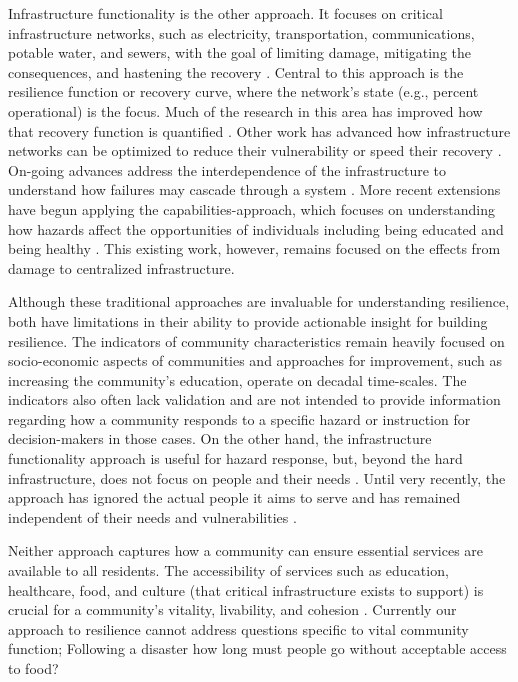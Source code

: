 \documentclass[9pt,twocolumn,twoside,lineno]{pnas-new}
\begin{document}
Infrastructure functionality is the other approach.
It focuses on critical infrastructure networks, such as electricity, transportation, communications, potable water, and sewers, with the goal of limiting damage, mitigating the consequences, and hastening the recovery \cite{Bruneau2003-px, Barker2013-od, Hosseini2016-pm, Haimes2009-gj, Guidotti2016-vu, Curt2018-kl}.
Central to this approach is the resilience function or recovery curve, where the network's state (e.g., percent operational) is the focus.
Much of the research in this area has improved how that recovery function is quantified \cite{Bruneau2003-px, Chang2004-et, Cimellaro2010-ov, Vugrin2010-vy, Ayyub2014-mf, Sharma2018-rs}.
Other work has advanced how infrastructure networks can be optimized to reduce their vulnerability or speed their recovery \cite{Hosseini2016-pm, Xu2007-sc}.
On-going advances address the interdependence of the infrastructure to understand how failures may cascade through a system \cite{Guidotti2016-vu, Gardoni2018-xu}.
More recent extensions \cite{Gardoni2018-xu, Clark2018-pr, Guidotti2019-fc} have begun applying the capabilities-approach, which focuses on understanding how hazards affect the opportunities of individuals including being educated and being healthy \cite{Murphy2006-io}. 
This existing work, however, remains focused on the effects from damage to centralized infrastructure.

Although these traditional approaches are invaluable for understanding resilience, both have limitations in their ability to provide actionable insight for building resilience.
The indicators of community characteristics remain heavily focused on socio-economic aspects of communities \cite{Koliou2018-jt} and approaches for improvement, such as increasing the community's education, operate on decadal time-scales.
The indicators also often lack validation \cite{Bakkensen2016-ht} and are not intended to provide information regarding how a community responds to a specific hazard or instruction for decision-makers in those cases.
On the other hand, the infrastructure functionality approach is useful for hazard response, but, beyond the hard infrastructure, does not focus on people and their needs \cite{Doorn2018-fx}. 
Until very recently, the approach has ignored the actual people it aims to serve and has remained independent of their needs and vulnerabilities \cite{Cutter2008-placeBasedModel, Cutter2010-vg}.

Neither approach captures how a community can ensure essential services are available to all residents. 
The accessibility of services such as education, healthcare, food, and culture (that critical infrastructure exists to support) is crucial for a community’s vitality, livability, and cohesion \cite{Dempsey2011-og, Talen2003-dc, Winter1997-kc, United_Nations_Educational_Scientific_and_Cultural_Organization2018-sf}. 
Currently our approach to resilience cannot address questions specific to vital community function;
Following a disaster how long must people go without acceptable access to food?
\end{document}
